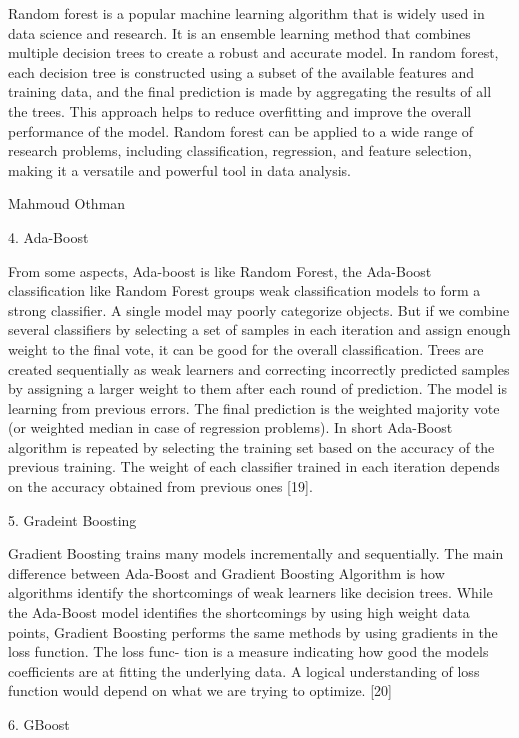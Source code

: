 \documentclass[final]{cvpr}
\begin{document}
Random forest is a popular machine learning algorithm that is widely used in data science and research. 
It is an ensemble learning method that combines multiple decision trees to create a robust and accurate model. 
In random forest, each decision tree is constructed using a subset of the available features and training data, and the final prediction is made by aggregating the results of all the trees. 
This approach helps to reduce overfitting and improve the overall performance of the model. 
Random forest can be applied to a wide range of research problems, including classification, regression, and feature selection, making it a versatile and powerful tool in data analysis.

Mahmoud Othman 

4. Ada-Boost

From some aspects, Ada-boost is like Random Forest, the
Ada-Boost classification like Random Forest groups weak
classification models to form a strong classifier. A single
model may poorly categorize objects. But if we combine
several classifiers by selecting a set of samples in each iteration
and assign enough weight to the final vote, it can be good
for the overall classification. Trees are created sequentially
as weak learners and correcting incorrectly predicted samples
by assigning a larger weight to them after each round of
prediction. The model is learning from previous errors. The
final prediction is the weighted majority vote (or weighted
median in case of regression problems). In short Ada-Boost
algorithm is repeated by selecting the training set based on the
accuracy of the previous training. The weight of each classifier
trained in each iteration depends on the accuracy obtained
from previous ones [19].

5. Gradeint Boosting

Gradient Boosting trains many models incrementally and
sequentially. The main difference between Ada-Boost and
Gradient Boosting Algorithm is how algorithms identify the
shortcomings of weak learners like decision trees. While the
Ada-Boost model identifies the shortcomings by using high
weight data points, Gradient Boosting performs the same
methods by using gradients in the loss function. The loss func-
tion is a measure indicating how good the models coefficients
are at fitting the underlying data. A logical understanding of
loss function would depend on what we are trying to optimize.
[20]

6. GBoost
\end{document}
